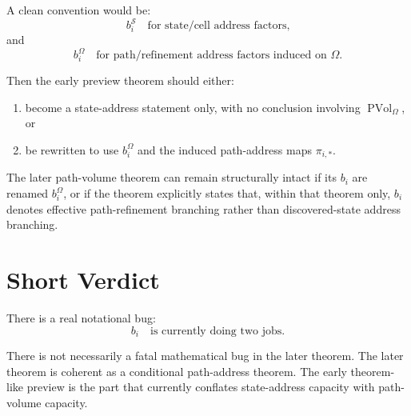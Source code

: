 \documentclass[11pt]{article}
\newcommand{\PVol}{\operatorname{PVol}}
\begin{document}
A clean convention would be:
\[
    b_i^{\mathcal S}
    \quad\text{for state/cell address factors,}
\]
and
\[
    b_i^\Omega
    \quad\text{for path/refinement address factors induced on }\Omega.
\]

Then the early preview theorem should either:

\begin{enumerate}
    \item become a state-address statement only, with no conclusion involving \(\PVol_\Omega\), or
    \item be rewritten to use \(b_i^\Omega\) and the induced path-address maps \(\pi_{i,*}\).
\end{enumerate}

The later path-volume theorem can remain structurally intact if its \(b_i\) are renamed \(b_i^\Omega\), or if the theorem explicitly states that, within that theorem only, \(b_i\) denotes effective path-refinement branching rather than discovered-state address branching.

\section*{Short Verdict}

There is a real notational bug:
\[
    b_i
    \quad\text{is currently doing two jobs.}
\]

There is not necessarily a fatal mathematical bug in the later theorem.  The later theorem is coherent as a conditional path-address theorem.  The early theorem-like preview is the part that currently conflates state-address capacity with path-volume capacity.
\end{document}
